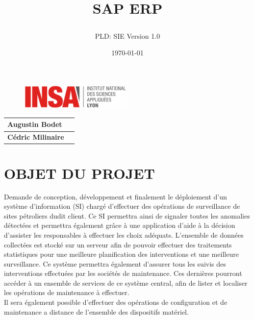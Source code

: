 \documentclass[]{scrartcl}
\title{SAP ERP
\subtitle{}
\author{PLD: SIE
Version 1.0}
\date{\today}}
\begin{document}
\maketitle

\begin{figure}[h]
	\centering
  \includegraphics[width=0.5\textwidth]{img/insa-logo}
	\label{fig:logo}
\end{figure}


\begin{center}
  \begin{tabular}{ | l | r | }
    \hline
    \textbf{Augustin Bodet}\\ \hline
    \textbf{Cédric Milinaire }\\ \hline
  \end{tabular}
\end{center}

\thispagestyle{empty}
\pagebreak
\vspace*{10pt}
\tableofcontents
\listoffigures
\newpage
\section{OBJET DU PROJET}
Demande de conception, développement et finalement le déploiement d'un système d'information (SI) chargé d'effectuer des opérations de surveillance de sites pétroliers dudit client. Ce SI permettra ainsi de signaler toutes les anomalies détectées et permettra également grâce à une application d'aide à la décision d'assister les responsables à effectuer les choix adéquats. L'ensemble de données collectées est stocké sur un serveur afin de pouvoir effectuer des traitements statistiques pour une meilleure planification des interventions et une meilleure surveillance. Ce système permettra également d'assurer tous les suivis des interventions effectuées par les sociétés de maintenance. Ces dernières pourront accéder à un ensemble de services de ce système central, afin de lister et localiser les opérations de maintenance à effectuer. \\

Il sera également possible d'effectuer des opérations de configuration et de maintenance a distance de l'ensemble des dispositifs matériel.\\
\end{document}
